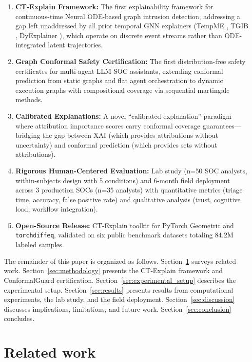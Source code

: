 \documentclass[preprint,review,12pt]{elsarticle}
\begin{document}
\begin{enumerate}
    \item \textbf{CT-Explain Framework:} The first explainability framework for continuous-time Neural ODE-based graph intrusion detection, addressing a gap left unaddressed by all prior temporal GNN explainers (TempME \cite{tempme_2024}, TGIB \cite{tgib_kdd_2024}, DyExplainer \cite{dyexplainer_2025}), which operate on discrete event streams rather than ODE-integrated latent trajectories.
    \item \textbf{Graph Conformal Safety Certification:} The first distribution-free safety certificates for multi-agent LLM SOC assistants, extending conformal prediction from static graphs \cite{conformalized_link_2024} and flat agent orchestration \cite{conformal_cpo_2025} to dynamic execution graphs with compositional coverage via sequential martingale methods.
    \item \textbf{Calibrated Explanations:} A novel ``calibrated explanation'' paradigm where attribution importance scores carry conformal coverage guarantees---bridging the gap between XAI (which provides attributions without uncertainty) and conformal prediction (which provides sets without attributions).
    \item \textbf{Rigorous Human-Centered Evaluation:} Lab study (n=50 SOC analysts, within-subjects design with 5 conditions) and 6-month field deployment across 3 production SOCs (n=35 analysts) with quantitative metrics (triage time, accuracy, false positive rate) and qualitative analysis (trust, cognitive load, workflow integration).
    \item \textbf{Open-Source Release:} CT-Explain toolkit for PyTorch Geometric and \texttt{torchdiffeq}, validated on six public benchmark datasets totaling 84.2M labeled samples.
\end{enumerate}

The remainder of this paper is organized as follows. Section~\ref{sec:related_work} surveys related work. Section~\ref{sec:methodology} presents the CT-Explain framework and ConformalGuard certification. Section~\ref{sec:experimental_setup} describes the experimental setup. Section~\ref{sec:results} presents results from computational experiments, the lab study, and the field deployment. Section~\ref{sec:discussion} discusses implications, limitations, and future work. Section~\ref{sec:conclusion} concludes.


\section{Related work}
\label{sec:related_work}
\end{document}
